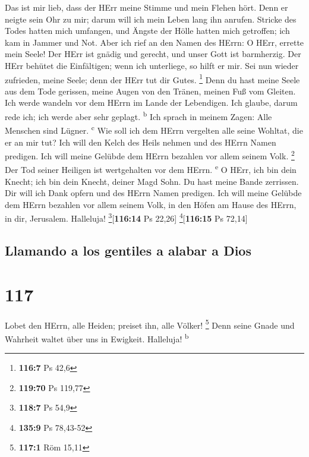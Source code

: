  Das ist mir lieb, dass der HErr meine Stimme und mein
Flehen hört.  Denn er neigte sein Ohr zu mir; darum will
ich mein Leben lang ihn anrufen.  Stricke des Todes hatten
mich umfangen, und Ängste der Hölle hatten mich getroffen; ich kam in
Jammer und Not.  Aber ich rief an den Namen des HErrn: O
HErr, errette mein Seele!  Der HErr ist gnädig und
gerecht, und unser Gott ist barmherzig.  Der HErr behütet
die Einfältigen; wenn ich unterliege, so hilft er mir. 
Sei nun wieder zufrieden, meine Seele; denn der HErr tut dir Gutes.
\footnote{\textbf{116:7} Ps 42,6}  Denn du hast meine
Seele aus dem Tode gerissen, meine Augen von den Tränen, meinen Fuß vom
Gleiten.  Ich werde wandeln vor dem HErrn im Lande der
Lebendigen.  Ich glaube, darum rede ich; ich werde aber
sehr geplagt. \textsuperscript{b}  Ich sprach in meinem
Zagen: Alle Menschen sind Lügner. \textsuperscript{c} 
Wie soll ich dem HErrn vergelten alle seine Wohltat, die er an mir tut?
 Ich will den Kelch des Heils nehmen und des HErrn Namen
predigen.  Ich will meine Gelübde dem HErrn bezahlen vor
allem seinem Volk. \footnote{\textbf{119:70} Ps 119,77} 
Der Tod seiner Heiligen ist wertgehalten vor dem HErrn.
\textsuperscript{e}  O HErr, ich bin dein Knecht; ich bin
dein Knecht, deiner Magd Sohn. Du hast meine Bande zerrissen.
 Dir will ich Dank opfern und des HErrn Namen predigen.
 Ich will meine Gelübde dem HErrn bezahlen vor allem
seinem Volk,  in den Höfen am Hause des HErrn, in dir,
Jerusalem. Halleluja! \footnote{\textbf{118:7} Ps 54,9}{[}\textbf{116:14}
Ps 22,26{]} \footnote{\textbf{135:9} Ps 78,43-52}{[}\textbf{116:15} Ps
72,14{]}

\hypertarget{llamando-a-los-gentiles-a-alabar-a-dios}{%
\subsection{Llamando a los gentiles a alabar a
Dios}\label{llamando-a-los-gentiles-a-alabar-a-dios}}

\hypertarget{section-116}{%
\section{117}\label{section-116}}

 Lobet den HErrn, alle Heiden; preiset ihn, alle Völker!
\footnote{\textbf{117:1} Röm 15,11}  Denn seine Gnade und
Wahrheit waltet über uns in Ewigkeit. Halleluja! \textsuperscript{b}

